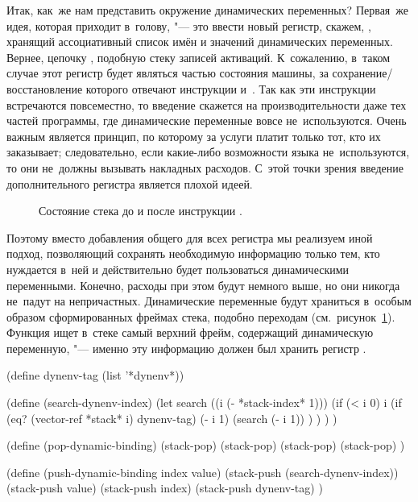 Итак, как~же нам представить окружение динамических переменных? Первая~же идея,
которая приходит в~голову, "--- это ввести новый регистр, скажем, ,
хранящий ассоциативный список имён и значений динамических переменных. Вернее,
цепочку , подобную стеку записей активаций. К~сожалению, в~таком
случае этот регистр будет являться частью состояния машины, за сохранение\slash
восстановление которого отвечают инструкции 
и~. Так как эти инструкции встречаются повсеместно, то введение
 скажется на производительности даже тех частей программы, где
динамические переменные вовсе не~используются. Очень важным является принцип, по
которому за услуги платит только тот, кто их заказывает; следовательно, если
какие-либо возможности языка не~используются, то они не~должны вызывать
накладных расходов. С~этой точки зрения введение дополнительного регистра
является плохой идеей.

\begin{figure}[tb]\begin{center}

\end{center}%
\caption{Состояние стека до и после инструкции \protect{}.}%
\label{compilation/dynamic/pic:subj}%
\end{figure}

Поэтому вместо добавления общего для всех регистра мы реализуем иной подход,
позволяющий сохранять необходимую информацию только тем, кто нуждается в~ней и
действительно будет пользоваться динамическими переменными. Конечно, расходы при
этом будут немного выше, но они никогда не~падут на непричастных. Динамические
переменные будут храниться в~особым образом сформированных фреймах стека,
подобно переходам (см.~рисунок~\ref{compilation/dynamic/pic:subj}). Функция
 ищет в~стеке самый верхний фрейм, содержащий
динамическую переменную, "--- именно эту информацию должен был хранить регистр
.

\begin{code:lisp}
(define dynenv-tag (list '*dynenv*))

(define (search-dynenv-index)
  (let search ((i (- *stack-index* 1)))
    (if (< i 0) i
        (if (eq? (vector-ref *stack* i) dynenv-tag)
            (- i 1)
            (search (- i 1)) ) ) ) )

(define (pop-dynamic-binding)
  (stack-pop)
  (stack-pop)
  (stack-pop)
  (stack-pop) )

(define (push-dynamic-binding index value)
  (stack-push (search-dynenv-index))
  (stack-push value)
  (stack-push index)
  (stack-push dynenv-tag) )
\end{code:lisp}

